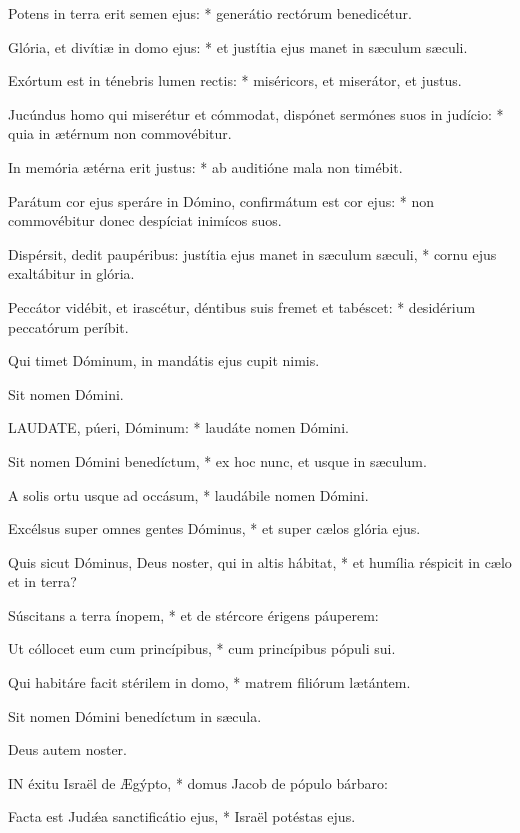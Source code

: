 Potens in terra erit semen ejus: * generátio rectórum benedicétur.

Glória, et divítiæ in domo ejus: * et justítia ejus manet in sæculum sæculi.

Exórtum est in ténebris lumen rectis: * miséricors, et miserátor, et justus.

Jucúndus homo qui miserétur et cómmodat, dispónet sermónes suos in judício: * quia in ætérnum non commovébitur.

In memória ætérna erit justus: * ab auditióne mala non timébit.

Parátum cor ejus speráre in Dómino, confirmátum est cor ejus: * non commovébitur donec despíciat inimícos suos.

Dispérsit, dedit paupéribus: justítia ejus manet in sæculum sæculi, * cornu ejus exaltábitur in glória.

Peccátor vidébit, et irascétur, déntibus suis fremet et tabéscet: * desidérium peccatórum períbit.

 Qui timet Dóminum, in mandátis ejus cupit nimis.

 Sit nomen Dómini.


\lettrine[lines=2]{L}{AUDATE}, púeri, Dóminum: * laudáte nomen Dómini.

Sit nomen Dómini benedíctum, * ex hoc nunc, et usque in sæculum.

A solis ortu usque ad occásum, * laudábile nomen Dómini.

Excélsus super omnes gentes Dóminus, * et super cælos glória ejus.

Quis sicut Dóminus, Deus noster, qui in altis hábitat, * et humília réspicit in cælo et in terra?

Súscitans a terra ínopem, * et de stércore érigens páuperem:

Ut cóllocet eum cum princípibus, * cum princípibus pópuli sui.

Qui habitáre facit stérilem in domo, * matrem filiórum lætántem.

 Sit nomen Dómini benedíctum in sæcula.

 Deus autem noster.


\lettrine[lines=2]{I}{N} éxitu Israël de Ægýpto, * domus Jacob de pópulo bárbaro:

Facta est Judǽa sanctificátio ejus, * Israël potéstas ejus.

